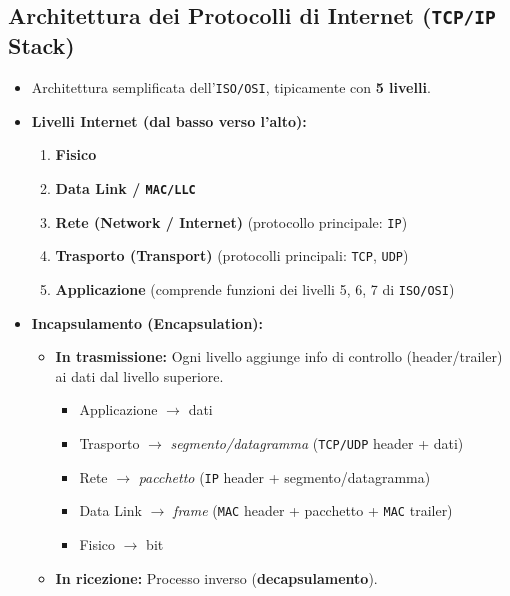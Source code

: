 \subsection{Architettura dei Protocolli di Internet (\texttt{TCP/IP} Stack)}
\begin{itemize}
    \item Architettura semplificata dell'\texttt{ISO/OSI}, tipicamente con \textbf{5 livelli}.
    \item \textbf{Livelli Internet (dal basso verso l'alto):}
    \begin{enumerate}
        \item \textbf{Fisico}
        \item \textbf{Data Link / \texttt{MAC/LLC}}
        \item \textbf{Rete (Network / Internet)} (protocollo principale: \texttt{IP})
        \item \textbf{Trasporto (Transport)} (protocolli principali: \texttt{TCP}, \texttt{UDP})
        \item \textbf{Applicazione} (comprende funzioni dei livelli 5, 6, 7 di \texttt{ISO/OSI})
    \end{enumerate}
    \item \textbf{Incapsulamento (Encapsulation):}
    \begin{itemize}
        \item \textbf{In trasmissione:} Ogni livello aggiunge info di controllo (header/trailer) ai dati dal livello superiore.
        \begin{itemize}
            \item Applicazione $\rightarrow$ dati
            \item Trasporto $\rightarrow$ \textit{segmento/datagramma} (\texttt{TCP/UDP} header + dati)
            \item Rete $\rightarrow$ \textit{pacchetto} (\texttt{IP} header + segmento/datagramma)
            \item Data Link $\rightarrow$ \textit{frame} (\texttt{MAC} header + pacchetto + \texttt{MAC} trailer)
            \item Fisico $\rightarrow$ bit
        \end{itemize}
        \item \textbf{In ricezione:} Processo inverso (\textbf{decapsulamento}).
    \end{itemize}
\end{itemize}

